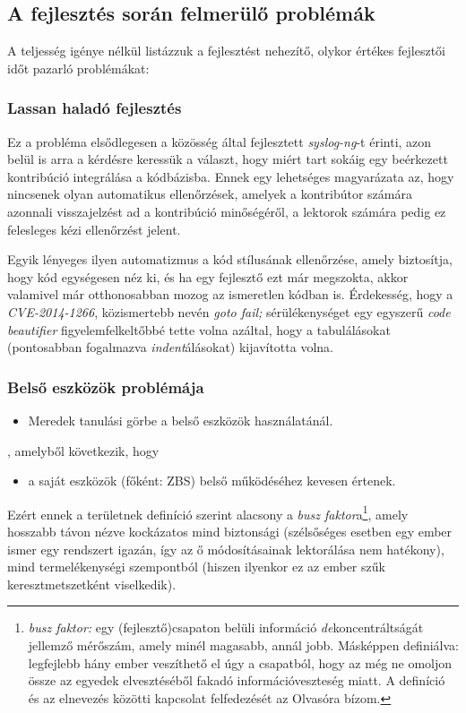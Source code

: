 \subsection{A fejlesztés során felmerülő problémák}

A teljesség igénye nélkül listázzuk a fejlesztést nehezítő, olykor értékes fejlesztői időt pazarló
problémákat:

\subsubsection{Lassan haladó fejlesztés}
Ez a probléma elsődlegesen a közösség által fejlesztett \emph{syslog-ng}-t érinti, azon belül is
arra a kérdésre keressük a választ, hogy miért tart sokáig egy beérkezett kontribúció integrálása
a kódbázisba. Ennek egy lehetséges magyarázata az, hogy nincsenek olyan automatikus ellenőrzések,
amelyek a kontribútor számára azonnali visszajelzést ad a kontribúció minőségéről, a lektorok
számára pedig ez felesleges kézi ellenőrzést jelent.

Egyik lényeges ilyen automatizmus a kód stílusának ellenőrzése, amely biztosítja, hogy kód
egységesen néz ki, és ha egy fejlesztő ezt már megszokta, akkor valamivel már otthonosabban mozog az
ismeretlen kódban is.  Érdekesség, hogy a \emph{CVE-2014-1266}\cite{cve20141266}, közismertebb nevén
\emph{goto fail;} sérülékenységet egy egyszerű \emph{code beautifier} figyelemfelkeltőbbé tette
volna azáltal, hogy a tabulálásokat (pontosabban fogalmazva \emph{indent}álásokat) kijavította
volna.

\subsubsection{Belső eszközök problémája}
\begin{itemize}
    \item Meredek tanulási görbe a belső eszközök használatánál.
\end{itemize}
, amelyből következik, hogy
\begin{itemize}
    \item a saját eszközök (főként: ZBS) belső működéséhez kevesen értenek.
\end{itemize}
Ezért ennek a területnek definíció szerint alacsony a \emph{busz faktor}a\footnote{\emph{busz
    faktor:} egy (fejlesztő)csapaton belüli információ \emph{de}koncentráltságát jellemző mérőszám,
    amely minél magasabb, annál jobb. Másképpen definiálva: legfejlebb hány ember veszíthető el úgy
a csapatból, hogy az még ne omoljon össze az egyedek elvesztéséből fakadó információveszteség miatt.
A definíció és az elnevezés közötti kapcsolat felfedezését az Olvasóra bízom.}, amely hosszabb távon
nézve kockázatos mind biztonsági (szélsőséges esetben egy ember ismer egy rendszert igazán, így az
ő módosításainak lektorálása nem hatékony), mind termelékenységi szempontból (hiszen ilyenkor ez az
ember szűk keresztmetszetként viselkedik).

